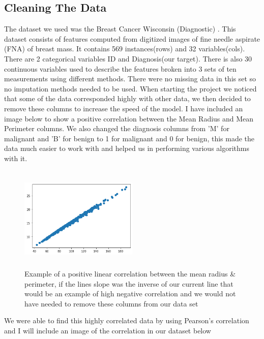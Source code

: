 \documentclass[conference]{IEEEtran}
\begin{document}
\subsection{Cleaning The Data}
The dataset we used was the Breast Cancer Wisconsin (Diagnostic) \cite{misc_breast_cancer_wisconsin_17}. This dataset consists of features computed from digitized images of fine needle aspirate (FNA) of breast mass. It contains 569 instances(rows) and 32 variables(cols). There are 2 categorical variables ID and Diagnosis(our target). There is also 30 continuous variables used to describe the features broken into 3 sets of ten measurements using different methods. There were no missing data in this set so no imputation methods needed to be used.
When starting the project we noticed that some of the data corresponded highly with other data, we then decided to remove these columns to increase the speed of the model.  I have included an image below to show a positive correlation between the Mean Radius and Mean Perimeter columns.  We also changed the diagnosis columns from 'M' for malignant and 'B' for benign to 1 for malignant and 0 for benign, this made the data much easier to work with and helped us in performing various algorithms with it.
\begin{figure}[H] 
\caption{Example of a positive linear correlation between the mean radius \& perimeter, if the lines slope was the inverse of our current line that would be an example of high negative correlation and we would not have needed to remove these columns from our data set}
\centering
\includegraphics[height=50mm,width=0.5\textwidth]{positive_correlation.png}
\end{figure}
We were able to find this highly correlated data by using Pearson's correlation and I will include an image of the correlation in our dataset below
\end{document}
